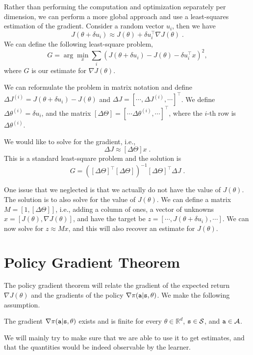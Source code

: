 Rather than performing  the computation and optimization separately per dimension, we can perform a more global approach and use a least-squares estimation of the gradient.
Consider a random vector $u_i$, then we have
\[
J(\theta+\delta u_i)\approx J(\theta)+\delta u_i^\top \nabla
J(\theta) \;.
\]
We can define the following least-square problem,
\[
G= \arg\min_x \sum_i (J(\theta+\delta u_i)- J(\theta)-\delta
u_i^\top x)^2,
\]
where $G$ is our estimate for $\nabla J(\theta)$.

We can reformulate the problem in matrix notation and define $\Delta
J^{(i)}=J(\theta+\delta u_i)- J(\theta)$ and $\Delta J= [\cdots ,
\Delta J^{(i)}, \cdots]^\top$. We define $\Delta \theta^{(i)}=\delta
u_i$, and the matrix $[\Delta\Theta]=[\cdots
\Delta\theta^{(i)},\cdots]^\top$, where the $i$-th row is
$\Delta\theta^{(i)}$.

We would like to solve for the gradient, i.e.,
\[
\Delta J\approx [\Delta \Theta]x\;.
\]
This is a standard least-square problem and the solution is
\[
G=([\Delta \Theta]^\top [\Delta \Theta])^{-1} [\Delta\Theta]^\top
\Delta J\;.
\]

One issue that we neglected is that we actually do not have the
value of $J(\theta)$. The solution is to also solve  for the value of
$J(\theta)$.
%
We can define a matrix $M=[1, [\Delta\Theta]]$, i.e., adding a column of ones, a vector of unknowns $x=[J(\theta), \nabla J(\theta)]$, and have the target be $z=[\cdots, J(\theta+\delta u_i),\cdots]$. We can now solve for $z\approx Mx$, and this will also recover an estimate for $J(\theta)$.


\section{Policy Gradient Theorem}

The policy gradient theorem will relate the gradient of the expected
return $\nabla J(\theta)$ and the gradients of the policy $\nabla
\pi({\tt a}|{\tt s},\theta)$. We make the following assumption.
\begin{assumption}\label{ass:differentiable_policy}
The gradient $\nabla
\pi({\tt a}|{\tt s},\theta)$ exists and is finite for every $\theta \in \mathbb{R}^d$, ${\tt s} \in \mathcal{S}$, and ${\tt a} \in \mathcal{A}$.
\end{assumption}

We will mainly try to make sure
that we are able to use it to get estimates, and that the quantities
would be indeed observable by the learner.

